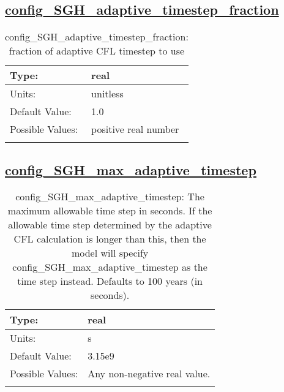 \subsection[config\_SGH\_adaptive\_timestep\_fraction]{\hyperref[sec:nm_tab_subglacial_hydro]{config\_SGH\_adaptive\_timestep\_fraction}}
\label{subsec:nm_sec_config_SGH_adaptive_timestep_fraction}
\begin{center}
\begin{longtable}{| p{2.0in} || p{4.0in} |}
    \hline
    Type: & real \\
    \hline
    Units: & \si{unitless} \\
    \hline
    Default Value: & 1.0 \\
    \hline
    Possible Values: & positive real number \\
    \hline
    \caption{config\_SGH\_adaptive\_timestep\_fraction: fraction of adaptive CFL timestep to use}
\end{longtable}
\end{center}
\subsection[config\_SGH\_max\_adaptive\_timestep]{\hyperref[sec:nm_tab_subglacial_hydro]{config\_SGH\_max\_adaptive\_timestep}}
\label{subsec:nm_sec_config_SGH_max_adaptive_timestep}
\begin{center}
\begin{longtable}{| p{2.0in} || p{4.0in} |}
    \hline
    Type: & real \\
    \hline
    Units: & \si{s} \\
    \hline
    Default Value: & 3.15e9 \\
    \hline
    Possible Values: & Any non-negative real value. \\
    \hline
    \caption{config\_SGH\_max\_adaptive\_timestep: The maximum allowable time step in seconds. If the allowable time step determined by the adaptive CFL calculation is longer than this, then the model will specify config\_SGH\_max\_adaptive\_timestep as the time step instead.  Defaults to 100 years (in seconds).}
\end{longtable}
\end{center}

